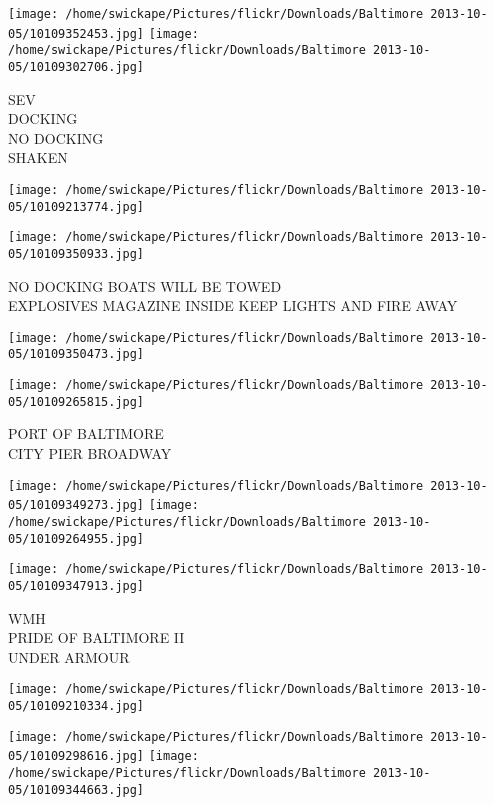\documentclass[10pt,letterpaper]{article}
\begin{document}
\texttt{[image: /home/swickape/Pictures/flickr/Downloads/Baltimore 2013-10-05/10109352453.jpg]}
\texttt{[image: /home/swickape/Pictures/flickr/Downloads/Baltimore 2013-10-05/10109302706.jpg]}

SEV\\
DOCKING\\
NO DOCKING\\
SHAKEN\\
\pagebreak

\texttt{[image: /home/swickape/Pictures/flickr/Downloads/Baltimore 2013-10-05/10109213774.jpg]}

\vspace{0.25in}
\texttt{[image: /home/swickape/Pictures/flickr/Downloads/Baltimore 2013-10-05/10109350933.jpg]}

NO DOCKING BOATS WILL BE TOWED\\
EXPLOSIVES MAGAZINE INSIDE KEEP LIGHTS AND FIRE AWAY\\
\pagebreak

\texttt{[image: /home/swickape/Pictures/flickr/Downloads/Baltimore 2013-10-05/10109350473.jpg]}

\vspace{0.25in}
\texttt{[image: /home/swickape/Pictures/flickr/Downloads/Baltimore 2013-10-05/10109265815.jpg]}

PORT OF BALTIMORE\\
CITY PIER BROADWAY\\
\pagebreak

\texttt{[image: /home/swickape/Pictures/flickr/Downloads/Baltimore 2013-10-05/10109349273.jpg]}
\texttt{[image: /home/swickape/Pictures/flickr/Downloads/Baltimore 2013-10-05/10109264955.jpg]}

\texttt{[image: /home/swickape/Pictures/flickr/Downloads/Baltimore 2013-10-05/10109347913.jpg]}

WMH\\
PRIDE OF BALTIMORE II\\
UNDER ARMOUR\\
\pagebreak

\texttt{[image: /home/swickape/Pictures/flickr/Downloads/Baltimore 2013-10-05/10109210334.jpg]}

\vspace{0.25in}
\texttt{[image: /home/swickape/Pictures/flickr/Downloads/Baltimore 2013-10-05/10109298616.jpg]}
\texttt{[image: /home/swickape/Pictures/flickr/Downloads/Baltimore 2013-10-05/10109344663.jpg]}
\end{document}
